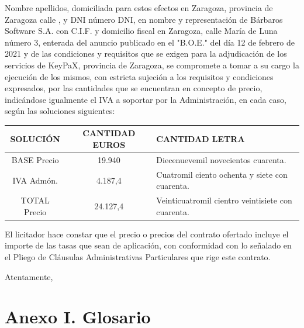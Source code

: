 \documentclass{article}
\begin{document}
Nombre apellidos, domiciliada para estos efectos en Zaragoza, provincia de Zaragoza calle , y DNI número DNI, en nombre y representación de Bárbaros Software S.A. con C.I.F. y domicilio fiscal en Zaragoza, calle María de Luna número 3, enterada del anuncio publicado en el "B.O.E." del día 12 de febrero de 2021 y de las condiciones y requisitos que se exigen para la adjudicación de los servicios de KeyPaX, provincia de Zaragoza, se compromete a tomar a su cargo la ejecución de los mismos, con estricta sujeción a los requisitos y condiciones expresados, por las cantidades que se encuentran en concepto de precio, indicándose igualmente el IVA a soportar por la Administración, en cada caso, según las soluciones siguientes:


\begin{table}[H]
    \centering
    \begin{tabular}{| c | c | p{15em} |}
    \hline
        SOLUCIÓN &  CANTIDAD EUROS & CANTIDAD LETRA \\ \hline
        BASE Precio & 19.940 & Diecenuevemil novecientos cuarenta.\\ \hline
        IVA Admón. &  4.187,4 & Cuatromil ciento ochenta y siete con cuarenta.\\ \hline
        TOTAL Precio &  24.127,4 & Veinticuatromil cientro veintisiete con cuarenta.\\ \hline
    \end{tabular}
\end{table}

El licitador hace constar que el precio o precios del contrato ofertado incluye el importe de las tasas que sean de aplicación, con conformidad con lo señalado en el Pliego de Cláusulas Administrativas Particulares que rige este contrato.

Atentamente,

\pagebreak

\section*{Anexo I. Glosario}
\end{document}
